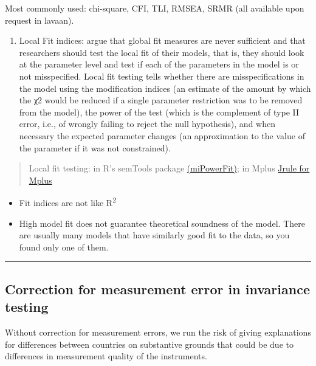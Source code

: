 \documentclass[
]{book}
\providecommand{\tightlist}{%
  \setlength{\itemsep}{0pt}\setlength{\parskip}{0pt}}
\begin{document}
Most commonly used: chi-square, CFI, TLI, RMSEA, SRMR (all available upon request in lavaan).

\begin{enumerate}
\def\labelenumi{\arabic{enumi}.}
\setcounter{enumi}{1}
\tightlist
\item
  Local Fit indices: \citet{Saris2009} argue that global fit measures are never sufficient and that researchers should test the local fit of their models, that is, they should look at the parameter level and test if each of the parameters in the model is or not misspecified. Local fit testing tells whether there are misspecifications in the model using the modification indices (an estimate of the amount by which the χ2 would be reduced if a single parameter restriction was to be removed from the model), the power of the test (which is the complement of type II error, i.e., of wrongly failing to reject the null hypothesis), and when necessary the expected parameter changes (an approximation to the value of the parameter if it was not constrained).
\end{enumerate}

\begin{quote}
Local fit testing: in R's semTools package \href{https://rdrr.io/cran/semTools/man/miPowerFit.html}{(miPowerFit)}; in Mplus \href{https://daob.nl/software/}{Jrule for Mplus}
\end{quote}

\begin{itemize}
\item
  Fit indices are not like R\textsuperscript{2}
\item
  High model fit does not guarantee theoretical soundness of the model. There are usually many models that have similarly good fit to the data, so you found only one of them.
\end{itemize}

\begin{center}\rule{0.5\linewidth}{0.5pt}\end{center}

\hypertarget{correction-for-measurement-error-in-invariance-testing}{%
\subsection{Correction for measurement error in invariance testing}\label{correction-for-measurement-error-in-invariance-testing}}

Without correction for measurement errors, we run the risk of giving explanations for differences between countries on substantive grounds that could be due to differences in measurement quality of the instruments.
\end{document}

